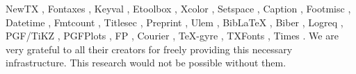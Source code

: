 \documentclass[10pt, twocolumn]{article}
\begin{document}
NewTX \texnewtxversion,
Fontaxes \texfontaxesversion,
Keyval \texxkeyvalversion,
Etoolbox \texetoolboxversion,
Xcolor \texxcolorversion,
Setspace \texsetspaceversion,
Caption \texcaptionversion,
Footmisc \texfootmiscversion,
Datetime \texdatetimeversion,
Fmtcount \texfmtcountversion,
Titlesec \textitlesecversion,
Preprint \texpreprintversion,
Ulem \texulemversion,
Bib\LaTeX{} \texbiblatexversion,
Biber \texbiberversion,
Logreq \texlogreqversion,
PGF/TiKZ \texpgfversion,
PGFPlots \texpgfplotsversion,
FP \texfpversion,
Courier \texcourierversion,
\TeX-gyre \textexgyreversion,
TXFonts \textxfontsversion,
Times \textimesversion.
We are very grateful to all their creators for freely
providing this necessary infrastructure. This research would not be
possible without them.

\printbibliography

\end{document}
